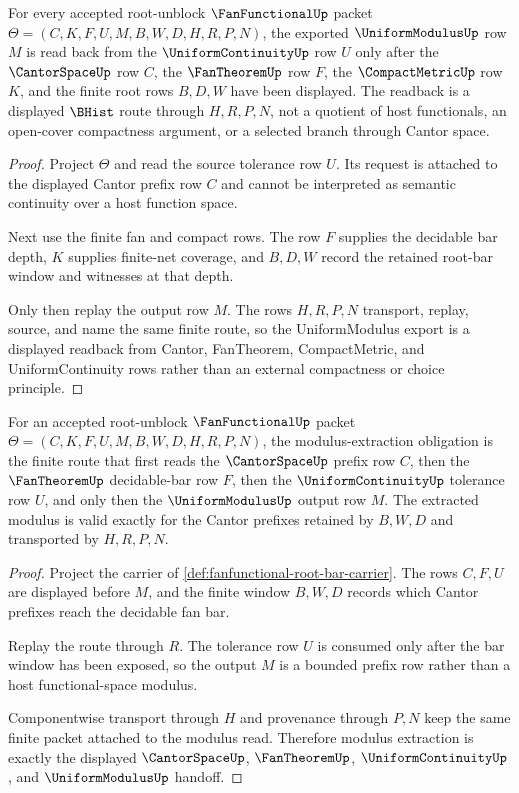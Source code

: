\begin{theorem}
\label{thm:fanfunctional-root-uniform-modulus-readback}
For every accepted root-unblock $\FanFunctionalUp$ packet $\Theta=(C,K,F,U,M,B,W,D,H,R,P,N)$, the exported $\UniformModulusUp$ row $M$ is read back from the $\UniformContinuityUp$ row $U$ only after the $\CantorSpaceUp$ row $C$, the $\FanTheoremUp$ row $F$, the $\CompactMetricUp$ row $K$, and the finite root rows $B,D,W$ have been displayed. The readback is a displayed $\BHist$ route through $H,R,P,N$, not a quotient of host functionals, an open-cover compactness argument, or a selected branch through Cantor space.
\end{theorem}
\begin{proof}
Project $\Theta$ and read the source tolerance row $U$. Its request is attached to the displayed Cantor prefix row $C$ and cannot be interpreted as semantic continuity over a host function space.

Next use the finite fan and compact rows. The row $F$ supplies the decidable bar depth, $K$ supplies finite-net coverage, and $B,D,W$ record the retained root-bar window and witnesses at that depth.

Only then replay the output row $M$. The rows $H,R,P,N$ transport, replay, source, and name the same finite route, so the UniformModulus export is a displayed readback from Cantor, FanTheorem, CompactMetric, and UniformContinuity rows rather than an external compactness or choice principle.
\end{proof}

\begin{theorem}
\label{thm:fanfunctional-modulus-extraction-obligations}
For an accepted root-unblock $\FanFunctionalUp$ packet $\Theta=(C,K,F,U,M,B,W,D,H,R,P,N)$, the modulus-extraction obligation is the finite route that first reads the $\CantorSpaceUp$ prefix row $C$, then the $\FanTheoremUp$ decidable-bar row $F$, then the $\UniformContinuityUp$ tolerance row $U$, and only then the $\UniformModulusUp$ output row $M$. The extracted modulus is valid exactly for the Cantor prefixes retained by $B,W,D$ and transported by $H,R,P,N$.
\end{theorem}
\begin{proof}
Project the carrier of \autoref{def:fanfunctional-root-bar-carrier}. The rows $C,F,U$ are displayed before $M$, and the finite window $B,W,D$ records which Cantor prefixes reach the decidable fan bar.

Replay the route through $R$. The tolerance row $U$ is consumed only after the bar window has been exposed, so the output $M$ is a bounded prefix row rather than a host functional-space modulus.

Componentwise transport through $H$ and provenance through $P,N$ keep the same finite packet attached to the modulus read. Therefore modulus extraction is exactly the displayed $\CantorSpaceUp$, $\FanTheoremUp$, $\UniformContinuityUp$, and $\UniformModulusUp$ handoff.
\end{proof}

